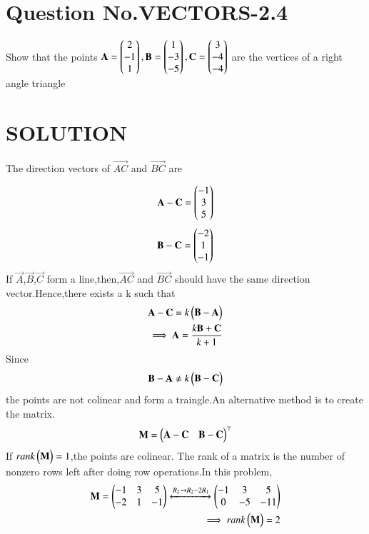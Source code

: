 \documentclass[journal,12pt,twocolumn]{IEEEtran}
\begin{document}
\section{Question No.VECTORS-2.4}
\item Show that the points 
$\mathbf{A} = \begin{pmatrix}2 \\ -1 \\ 1\end{pmatrix},\mathbf{B}=\begin{pmatrix}1 \\ -3\\-5\end{pmatrix},\mathbf{C}=\begin{pmatrix}3\\-4\\-4\end{pmatrix}$
are the vertices of a right angle triangle
%
\section{SOLUTION}
The direction vectors of $\vec{AC}$ and $\vec{BC}$ are 
\item 
\begin{align}
\mathbf{A-C}=\begin{pmatrix}-1\\3\\5\end{pmatrix}\label{2.0.1}
\end{align}
\begin{align}
\mathbf{B-C}=\begin{pmatrix}-2\\1\\-1\end{pmatrix}\label{2.0.2}
\end{align}
If $\vec{A}$,$\vec{B}$,$\vec{C}$ form a line,then,$\vec{AC}$ and $\vec{BC}$ should have the same direction vector.Hence,there exists a k such that 
\begin{align}
\mathbf{A-C}=k\begin{pmatrix}\mathbf{B-A}\end{pmatrix}
\\
\implies \mathbf{A}=\frac{k\mathbf{B+C}}{k+1}
\end{align}
Since
\begin{align}
\mathbf{B-A} \neq k\begin{pmatrix}\mathbf{B-C}\end{pmatrix}
\end{align}
the points are not colinear and form a traingle.An alternative method is to create the matrix.
\begin{align}
\mathbf{M}=\begin{pmatrix}\mathbf{A-C}&\mathbf{B-C}\end{pmatrix}^\top
\end{align}
If $rank\begin{pmatrix}\mathbf{M}\end{pmatrix}=1$,the points are colinear. The rank of a matrix is the number of nonzero rows left after doing row operations.In this problem,
\begin{align}
\mathbf{M}=\begin{pmatrix}-1 & 3 &5 \\ -2 & 1 & -1\end{pmatrix}\xleftrightarrow{R_2 \rightarrow R_2-2R_1}
\begin{pmatrix}-1 & 3 & 5\\ 0 & -5 & -11\end{pmatrix}
\\
\implies rank\begin{pmatrix}\mathbf{M}\end{pmatrix}=2
\end{align}
\end{document}
